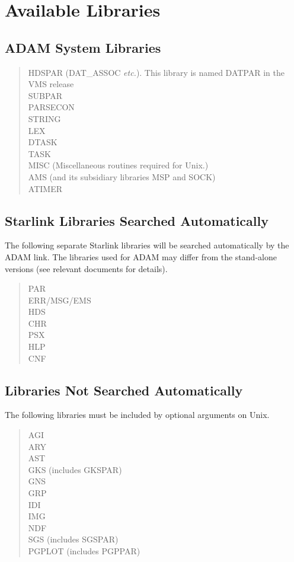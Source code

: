 \documentclass[twoside,11pt,nolof]{starlink}
\begin{document}
\section{\label{libs}Available Libraries}
\subsection*{ADAM System Libraries}
\begin{verse}
HDSPAR (DAT\_ASSOC \textit{etc.}). This library is named DATPAR in the VMS
release \\
SUBPAR \\
PARSECON \\
STRING \\
LEX \\
DTASK \\
TASK \\
MISC (Miscellaneous routines required for Unix.) \\
AMS (and its subsidiary libraries MSP and SOCK) \\
ATIMER
\end{verse}

\subsection*{Starlink Libraries Searched Automatically}
The following separate Starlink libraries will be searched automatically by
the ADAM link. The libraries used for ADAM may differ from the stand-alone
versions (see relevant documents for details).

\begin{verse}
PAR \\
ERR/MSG/EMS \\
HDS \\
CHR \\
PSX \\
HLP \\
CNF
\end{verse}

\subsection*{Libraries Not Searched Automatically}
The following libraries must be included by optional arguments on Unix.

\begin{verse}
AGI \\
ARY \\
AST \\
GKS (includes GKSPAR) \\
GNS \\
GRP \\
IDI \\
IMG \\
NDF \\
SGS (includes SGSPAR) \\
PGPLOT (includes PGPPAR) \\
\end{verse}
\end{document}
